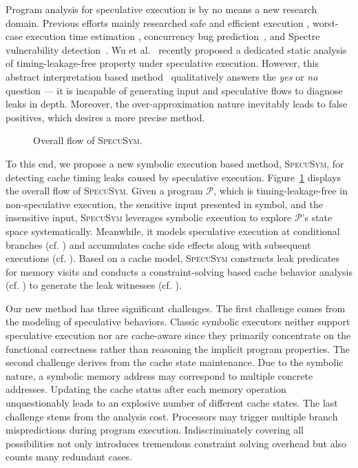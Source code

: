 \documentclass[sigconf]{acmart}
\newcommand*\circled[1]{\tikz[baseline=(char.base)]{
				\node[shape=circle,draw,inner sep=1pt] (char) {\scriptsize{#1}};}}
\newcommand{\prog}{\mathcal{P}}
\begin{document}
Program analysis for speculative execution is by no means a new research domain. 
Previous efforts mainly researched safe and efficient execution
\cite{ChenLDHY04,PrabhuRV10,GuarnieriKMRS19}, worst-case execution time estimation
\cite{LiMR03,LiMR05}, concurrency bug prediction~\cite{ChenWYS09,LiELS05}, and 
Spectre vulnerability detection~\cite{GuarnieriKMRS19,OleksenkoTSF19,WangCBMR19}. 
Wu et al.~\cite{WuW19} recently proposed a dedicated static  analysis of 
timing-leakage-free property under speculative execution. However, this abstract 
interpretation based method~\cite{WuW19} qualitatively answers the \textit{yes} or 
\textit{no} question --- it is incapable of generating input and speculative flows 
to diagnose leaks in depth. Moreover, the over-approximation nature inevitably 
leads to false positives, which desires a more precise method.


\begin{figure}[htb]
  \centering
  \scalebox{1.0}{}
  \caption{Overall flow of \textsc{SpecuSym}.}
  \label{fig:overall_flow}
	\vspace{-2ex}
\end{figure}


To this end, we propose a new symbolic execution based method, \textsc{SpecuSym}, 
for detecting cache timing leaks caused by speculative 
execution. Figure~\ref{fig:overall_flow} displays the overall flow of 
\textsc{SpecuSym}. Given a program $\prog$, which is timing-leakage-free in 
non-speculative execution, the sensitive input presented in symbol, and the 
insensitive input, \textsc{SpecuSym} leverages symbolic execution to explore 
$\prog$'s state space systematically. Meanwhile, it models speculative execution 
at conditional branches (cf. \circled{1}) and accumulates cache side effects
along with subsequent executions (cf. \circled{2}). Based on a cache model, 
\textsc{SpecuSym} constructs leak predicates for memory visits and conducts a 
constraint-solving based cache behavior analysis (cf. \circled{3}) to generate 
the leak witnesses (cf. \circled{4}). 


Our new method has three significant challenges. The first challenge comes from 
the modeling of speculative behaviors. Classic symbolic executors
\cite{CadarDE08,PasareanuR10} 
neither support speculative execution nor are cache-aware since they primarily 
concentrate on the functional correctness rather than reasoning the implicit 
program properties. 
%
The second challenge derives from the cache state maintenance. Due to the symbolic 
nature, a symbolic memory address may correspond to multiple concrete addresses. 
Updating the cache status after each memory operation unquestionably leads to an
explosive number of different cache states. 
%
The last challenge stems from the analysis cost. Processors may trigger multiple 
branch mispredictions during program execution. Indiscriminately covering all 
possibilities not only introduces tremendous constraint solving overhead but also 
counts many redundant cases. 
\end{document}
